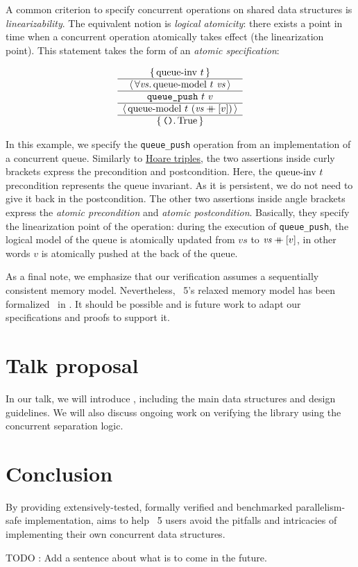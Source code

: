 \documentclass[a4paper, 11pt]{article}
\begin{document}
A common criterion to specify concurrent operations on shared data structures is \emph{linearizability}.
The equivalent \Iris notion is \emph{logical atomicity}: there exists a point in time when a concurrent operation atomically takes effect (the linearization point).
This statement takes the form of an \emph{atomic specification}:

\[
  \begin{array}{c} \left\lbrace\, 
    \mathrm{queue {\hbox{-}} inv}\ t
   \,\right\rbrace \\ \hline \left\langle\, \forall 
    \mathit{vs}
   \ldotp 
    \mathrm{queue {\hbox{-}} model}\ t\  \mathit{vs}
   \,\right\rangle \\ \hline 
    \texttt{queue\_push}\ t\ v
   \\ \hline \left\langle\, 
    \mathrm{queue {\hbox{-}} model}\ t\  (\mathit{vs} \mathbin{+\mkern-10mu+} [v])
   \,\right\rangle \\ \hline \left\lbrace\, 
    \texttt{()}
   \ldotp 
    \mathrm{True}
   \,\right\rbrace \end{array}
\]

In this example, we specify the \texttt{queue\_push} operation from an implementation of a concurrent queue.
Similarly to \href{https://en.wikipedia.org/wiki/Hoare_logic}{Hoare triples}, the two assertions inside curly brackets express the precondition and postcondition.
Here, the $\mathrm{queue {\hbox{-}} inv}\ t$ precondition represents the queue invariant.
As it is persistent, we do not need to give it back in the postcondition.
The other two assertions inside angle brackets express the \emph{atomic precondition} and \emph{atomic postcondition}.
Basically, they specify the linearization point of the operation: during the execution of \texttt{queue\_push}, the logical model of the queue is atomically updated from $\mathit{vs}$ to $\mathit{vs} \mathbin{+\mkern-10mu+} [v]$, in other words $v$ is atomically pushed at the back of the queue.

As a final note, we emphasize that our verification assumes a sequentially consistent memory model.
Nevertheless, \OCaml~5's relaxed memory model has been formalized~\cite{DBLP:journals/pacmpl/MevelJP20} in \Iris.
It should be possible and is future work to adapt our specifications and proofs to support it.

\section{Talk proposal}

In our talk, we will introduce \Saturn, including the main data structures and design guidelines.
We will also discuss ongoing work on verifying the library using the \Iris concurrent separation logic.


\section{Conclusion}
By providing extensively-tested, formally verified and benchmarked parallelism-safe implementation, \Saturn aims to help \OCaml~5 users avoid the pitfalls and intricacies of implementing their own concurrent data structures. 

TODO : Add a sentence about what is to come in the future.

\printbibliography
\end{document}
